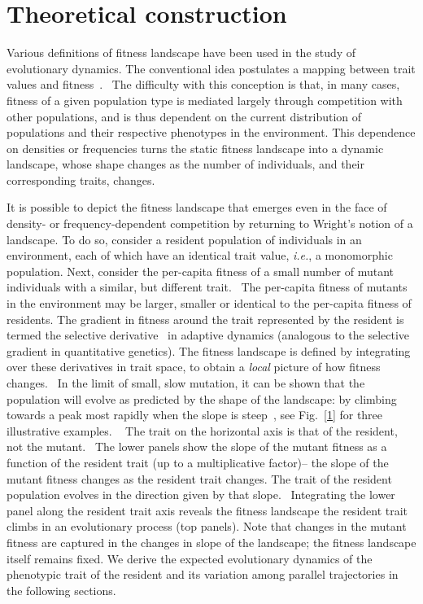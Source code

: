 \section{Theoretical construction}
Various definitions of fitness landscape have been used in
the study of evolutionary dynamics.
The conventional idea postulates a mapping between trait values and
fitness~\citep{levins62, levins64, rueffler04}.  The difficulty with
this conception is that, in
many cases, fitness of a given population type
is mediated largely through competition with
other populations, and is thus dependent on the current distribution
of populations
and their respective phenotypes in the environment.
This dependence on densities or frequencies turns the static
fitness landscape into a dynamic landscape,
whose shape changes as the number of individuals, and their
corresponding traits, changes.

It is possible to depict the fitness landscape that emerges even in the
face of density- or frequency-dependent
competition by returning to Wright's notion of a
landscape. To do so, consider
a resident population of individuals in an environment, each of which have
an identical trait value, \emph{i.e.}, a monomorphic population.
Next, consider the per-capita fitness of a small number of mutant individuals
with a similar, but different trait.  The per-capita fitness of mutants
in the environment may be larger, smaller or identical to the per-capita
fitness of residents.
The gradient in fitness around the trait represented by the resident
is termed the selective derivative~\citep{geritz_prl1997} in adaptive
dynamics (analogous to the selective gradient in quantitative
genetics).
The fitness landscape is defined by integrating over these derivatives in trait
space, to obtain a \emph{local} picture of how fitness changes.  In
the limit of
small, slow mutation, it can be shown that the population will evolve
as predicted
by the shape of the landscape: by climbing towards a peak most rapidly when the
slope is steep~\citep{rueffler04}, see Fig.~\ref{1} for three
illustrative examples.   The trait on the horizontal axis is that of the
resident, not the mutant.  The lower panels show the slope of the mutant
fitness as a function of the resident trait (up to a multiplicative factor)-- the slope of the mutant fitness
changes as the resident trait changes. The trait of the resident
population evolves in the direction given by that slope.  Integrating
the lower panel along the resident trait axis reveals the fitness
landscape
the resident trait climbs in an evolutionary process (top panels).
Note that changes in the mutant fitness are captured in the changes in
slope of the landscape; the fitness landscape itself remains fixed.
We derive the expected evolutionary dynamics of the phenotypic trait of the
resident and its variation
among parallel trajectories in the following sections.

